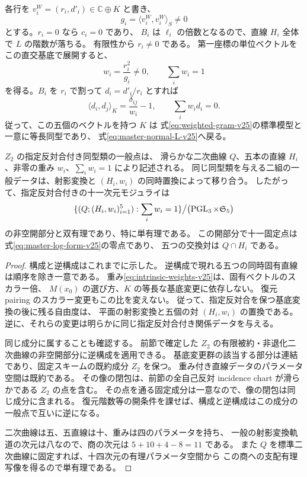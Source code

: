 各行を $v_i^W=(r_i,d'_i)\in\mathbb C\oplus K$ と書き、
\[
 g_i=\langle v_i^W,v_i^W\rangle_S\ne0
\]
とする。$r_i=0$ なら $c_i=0$ であり、
$B_i$ は $\ell_i$ の倍数となるので、直線 $H_i$ 全体で $L$ の階数が落ちる。
有限性から $r_i\ne0$ である。
第一座標の単位ベクトルをこの直交基底で展開すると、
\begin{equation}\label{eq:intrinsic-weights-v25}
 w_i=\frac{r_i^2}{g_i}\ne0,\qquad\sum_iw_i=1
\end{equation}
を得る。$B_i$ を $r_i$ で割って $d_i=d'_i/r_i$ とすれば
\[
 \langle d_i,d_j\rangle_K=\frac{\delta_{ij}}{w_i}-1,
 \qquad\sum_iw_i d_i=0.
\]
従って、この五個のベクトルを持つ $K$ は
式\eqref{eq:weighted-gram-v25}の標準模型と一意に等長同型であり、
式\eqref{eq:master-normal-L-v25}へ戻る。

\begin{theorem}[重み付き五直線による双有理記述]
\label{thm:master-birational-v25}
$Z_2$ の指定反対合付き同型類の一般点は、
滑らかな二次曲線 $Q$、五本の直線 $H_i$、非零の重み $w_i$、$\sum_iw_i=1$ により記述される。
同じ同型類を与える二組の一般データは、射影変換と
$(H_i,w_i)$ の同時置換によって移り合う。
したがって、指定反対合付きの十一次元モジュライは
\[
 \{(Q;(H_i,w_i)_{i=1}^5):\sum_iw_i=1\}
 \big/\bigl(\operatorname{PGL}_3\times\mathfrak S_5\bigr)
\]
の非空開部分と双有理であり、特に単有理である。
この開部分で十一固定点は式\eqref{eq:master-log-form-v25}の零点であり、
五つの交換対は $Q\cap H_i$ である。
\end{theorem}
\begin{proof}
構成と逆構成はこれまでに示した。
逆構成で現れる五つの同時固有直線は順序を除き一意である。
重み\eqref{eq:intrinsic-weights-v25}は、固有ベクトルのスカラー倍、
$M(x_0)$ の選び方、$K$ の等長な基底変更に依存しない。
復元 pairing のスカラー変更もこの比を変えない。
従って、指定反対合を保つ基底変換の後に残る自由度は、
平面の射影変換と五個の対 $(H_i,w_i)$ の置換である。
逆に、それらの変更は明らかに同じ指定反対合付き関係データを与える。

同じ成分に属することも確認する。
前節で確定した $Z_2$ の有限被約・非退化二次曲線の非空開部分に逆構成を適用できる。
基底変更群の該当する部分は連結であり、固定スキームの既約成分 $Z_2$ を保つ。
重み付き直線データのパラメータ空間は既約である。
その像の閉包は、前節の全自己反対 incidence chart が滑らかである $Z_2$ の点を含む。
その点を通る固定成分は一意なので、像の閉包は同じ成分に含まれる。
復元階数等の開条件を課せば、構成と逆構成はこの成分の一般点で互いに逆になる。

二次曲線は五、五直線は十、重みは四のパラメータを持ち、
一般の射影変換軌道の次元は八なので、商の次元は $5+10+4-8=11$ である。
また $Q$ を標準二次曲線に固定すれば、十四次元の有理パラメータ空間から
この商への支配有理写像を得るので単有理である。
\end{proof}

